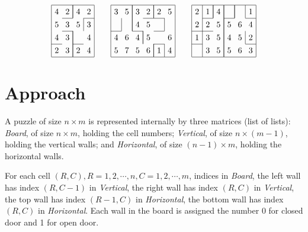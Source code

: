 \documentclass[runningheads]{llncs}
\newcommand*{\cc}[2]{\multicolumn{1}{#1}{#2}}
\begin{document}
\begin{equation*}
\arraycolsep=4.0pt\def\arraystretch{1.3}
\begin{array}[c]{|c c c c|}
\hline
4 & \cc{ c|}{2} & \cc{|c }{4} & 2\\
\cline{2-2}\cline{4-4}
5 & \cc{ c }{3} & \cc{ c|}{5} & 3\\
\cline{2-2}
4 & \cc{ c|}{3} & \cc{|c }{ } & 4\\
\cline{1-1}\cline{3-3}
2 & \cc{ c|}{3} & \cc{|c }{2} & 4\\
\hline
\end{array}
\qquad
\begin{array}[c]{|c c c c c c|}
\hline
3 & \cc{ c|}{5} & \cc{|c }{3} & \cc{ c|}{2} & \cc{|c }{2} & 5\\
\cline{4-5}
  & \cc{|c|}{ } & \cc{|c }{4} & \cc{ c }{5} & \cc{ c|}{ } &  \\
\cline{1-1}\cline{3-3}\cline{5-5}
4 & \cc{ c }{6} & \cc{ c|}{4} & \cc{|c }{5} & \cc{ c }{ } & 6\\
\cline{5-5}
5 & \cc{ c }{7} & \cc{ c }{5} & \cc{ c|}{6} & \cc{|c|}{1} & 4\\
\hline
\end{array}
\qquad
\begin{array}[c]{|c c c c c c|}
\hline
2 & \cc{|c|}{1} & \cc{|c|}{4} & \cc{|c|}{ } & \cc{|c|}{ } & 1\\
\cline{2-2}\cline{4-4}\cline{6-6}
2 & \cc{|c }{2} & \cc{ c|}{5} & \cc{|c }{5} & \cc{ c }{6} & 4\\
\cline{1-2}
1 & \cc{|c }{3} & \cc{ c|}{5} & \cc{|c }{4} & \cc{ c|}{5} & 2\\
\cline{1-1}\cline{6-6}
  & \cc{|c }{3} & \cc{ c|}{5} & \cc{|c }{5} & \cc{ c }{6} & 3\\
\hline
\end{array}
\end{equation*}

\section{Approach}
\label{sec:approach}

A puzzle of size $n\times m$ is represented internally by three matrices (list of lists): \textsl{Board}, of size $n\times m$, holding the cell numbers; \textsl{Vertical}, of size $n\times (m-1)$, holding the vertical walls; and \textsl{Horizontal}, of size $(n-1)\times m$, holding the horizontal walls.

For each cell $(R,C), R=1,2,\cdots,n, C=1,2,\cdots,m$, indices in \textsl{Board}, the left wall has index $(R,C-1)$ in \textsl{Vertical}, the right wall has index $(R,C)$ in \textsl{Vertical}, the top wall has index $(R-1,C)$ in \textsl{Horizontal}, the bottom wall has index $(R,C)$ in \textsl{Horizontal}.
Each wall in the board is assigned the number 0 for closed door and 1 for open door.
\end{document}
